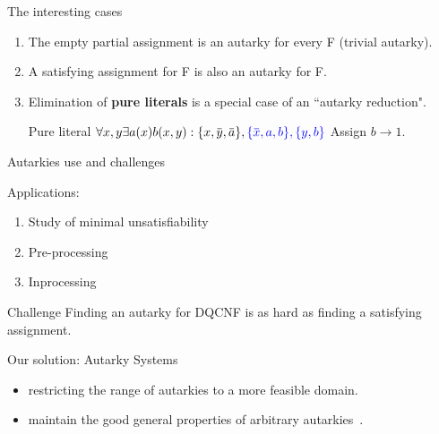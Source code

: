 \documentclass[xcolor=table	]{beamer}
\newcommand{\ov}[1]{\mkern 1.5mu\overline{\mkern-1.5mu#1\mkern-1.5mu}\mkern 1.5mu}
\begin{document}
\begin{frame}{The interesting cases}

\begin{enumerate}
	\item The empty partial assignment is an autarky for every F \newline (trivial autarky).\newline 
	
	\item A satisfying assignment for F is also an autarky for F. \newline
	\pause 
	\item Elimination of \textbf{pure literals} is a special case of an ``autarky reduction". 
	\newline
	\begin{exampleblock}{Pure literal}
			$\forall x, y \exists a(x) b(x,y) : \{x, \ov{y}, \ov{a}\}, \textcolor{blue}{\{\ov{x}, a, b\}, \{y, b\}} $ \newline 
		Assign $b \to 1$.
	\end{exampleblock}

\end{enumerate}



\end{frame}


\begin{frame}{Autarkies use and challenges}

Applications: 
\begin{enumerate}
    \item Study of minimal unsatisfiability~\cite{buning2009minimal}
    \item Pre-processing 
    \item Inprocessing
\end{enumerate}

 \begin{exampleblock}{Challenge}
 Finding an autarky for DQCNF is as hard as finding a satisfying assignment.
\end{exampleblock}
    \pause 
  \begin{alertblock}{Our solution: Autarky Systems}
  \begin{itemize}
      \item restricting the range of autarkies to a more feasible domain.
      \item maintain the good general properties of arbitrary autarkies~\cite{buning2009minimal}.
  \end{itemize}
 
  \end{alertblock}

\end{frame}
\end{document}
